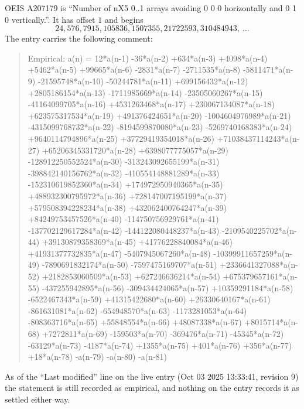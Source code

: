 \documentclass[11pt,a4paper]{article}
\theoremstyle{plain}
\theoremstyle{definition}
\begin{document}
OEIS A207179 is ``Number of nX5 0..1 arrays avoiding 0 0 0 horizontally and 0 1 0 vertically.''. It has offset
$1$ and begins
\[
24, 576, 7915, 105836, 1507355, 21722593, 310484943,\ \dots
\]
The entry carries the following comment:
\begin{quote}\small
Empirical: a(n) = 12*a(n-1) -36*a(n-2) +634*a(n-3) +4098*a(n-4) +5462*a(n-5) +99665*a(n-6) -2831*a(n-7) -2711535*a(n-8) -5811471*a(n-9) -21595748*a(n-10) -50244781*a(n-11) +699156432*a(n-12) +2805186154*a(n-13) -1711985669*a(n-14) -23505060267*a(n-15) -41164099705*a(n-16) +4531263468*a(n-17) +230067134087*a(n-18) +623575317534*a(n-19) +491376424651*a(n-20) -1004604976989*a(n-21) -4315099768732*a(n-22) -8194599870080*a(n-23) -5269740168383*a(n-24) +9640114794896*a(n-25) +37729419354018*a(n-26) +71038437114243*a(n-27) +65206345331720*a(n-28) +6398077775057*a(n-29) -128912250552524*a(n-30) -313243092655199*a(n-31) -398842140156762*a(n-32) -410554148881289*a(n-33) -152310619852360*a(n-34) +174972950940365*a(n-35) +488932300795972*a(n-36) +728147007195199*a(n-37) +579508394228234*a(n-38) +432062400764247*a(n-39) +84249753457526*a(n-40) -114750756929761*a(n-41) -137702129617284*a(n-42) -144122080448237*a(n-43) -2109540225702*a(n-44) +39130879358369*a(n-45) +41776228840084*a(n-46) +41931377732835*a(n-47) -5407945067260*a(n-48) -10399911657259*a(n-49) -7890691832174*a(n-50) -7597475169707*a(n-51) +2336641327088*a(n-52) +2182853060509*a(n-53) +627246636214*a(n-54) +675379657161*a(n-55) -437255942895*a(n-56) -309434424065*a(n-57) +10359291184*a(n-58) -6522467343*a(n-59) +41315422680*a(n-60) +26330640167*a(n-61) -861631081*a(n-62) -654948570*a(n-63) -1173281053*a(n-64) -808363716*a(n-65) +55848554*a(n-66) +48087338*a(n-67) +8015714*a(n-68) +7272811*a(n-69) -159503*a(n-70) -369476*a(n-71) -45345*a(n-72) -63129*a(n-73) -4187*a(n-74) +1355*a(n-75) +401*a(n-76) +356*a(n-77) +18*a(n-78) -a(n-79) -a(n-80) -a(n-81)
\end{quote}
As of the ``Last modified'' line on the live entry (Oct 03 2025 13:33:41, revision
9) the statement is still recorded as empirical, and nothing on the entry
records it as settled either way.
\end{document}
